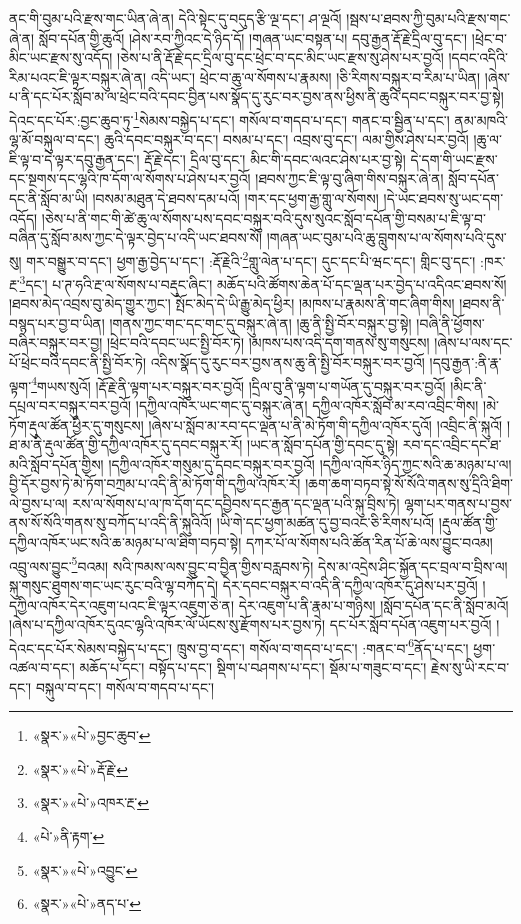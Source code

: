 ནང་གི་བུམ་པའི་རྫས་གང་ཡིན་ཞེ་ན། དེའི་སྟེང་དུ་བདུད་རྩི་ལྔ་དང་། ཤ་ལྔའོ། །སྦས་པ་ཐབས་ཀྱི་བུམ་པའི་རྫས་གང་ཞེ་ན། སློབ་དཔོན་གྱི་ཆུའོ། །ཤེས་རབ་ཀྱིའང་དེ་ཉིད་དོ། །གཞན་ཡང་བསྟན་པ། དབུ་རྒྱན་རྡོ་རྗེ་དྲིལ་བུ་དང་། །ཕྲེང་བ་མིང་ཡང་རྫས་སུ་འདོད། །ཅེས་པ་ནི་རྡོ་རྗེ་དང་དྲིལ་བུ་དང་ཕྲེང་བ་དང་མིང་ཡང་རྫས་སུ་ཤེས་པར་བྱའོ། །དབང་འདིའི་རིམ་པའང་ཇི་ལྟར་བསྐུར་ཞེ་ན། འདི་ཡང་། ཕྲེང་བ་ཆུ་ལ་སོགས་པ་རྣམས། །ཅི་རིགས་བསྐུར་བ་རིམ་པ་ཡིན། །ཞེས་པ་ནི་དང་པོར་སློབ་མ་ལ་ཕྲེང་བའི་དབང་བྱིན་པས་སྣོད་དུ་རུང་བར་བྱས་ནས་ཕྱིས་ནི་ཆུའི་དབང་བསྐུར་བར་བྱ་སྟེ། དེའང་དང་པོར་:བྱང་ཆུབ་ཏུ་\footnote{«སྣར་»«པེ་»བྱང་ཆུབ་}སེམས་བསྐྱེད་པ་དང་། གསོལ་བ་གདབ་པ་དང་། གནང་བ་སྦྱིན་པ་དང་། ནམ་མཁའི་ལྷ་མོ་བསྐུལ་བ་དང་། ཆུའི་དབང་བསྐུར་བ་དང་། བསམ་པ་དང་། འབྲས་བུ་དང་། ལམ་གྱིས་ཤེས་པར་བྱའོ། །ཆུ་ལ་ཇི་ལྟ་བ་དེ་ལྟར་དབུ་རྒྱན་དང་། རྡོ་རྗེ་དང་། དྲིལ་བུ་དང་། མིང་གི་དབང་ལའང་ཤེས་པར་བྱ་སྟེ། དེ་དག་གི་ཡང་རྫས་དང་སྔགས་དང་ལྷའི་ཁ་དོག་ལ་སོགས་པ་ཤེས་པར་བྱའོ། །ཐབས་ཀྱང་ཇི་ལྟ་བུ་ཞིག་གིས་བསྐུར་ཞེ་ན། སློབ་དཔོན་དང་ནི་སློབ་མ་ཡི། །བསམ་མཐུན་དེ་ཐབས་དམ་པའོ། །གར་དང་ཕྱག་རྒྱ་གླུ་ལ་སོགས། །དེ་ཡང་ཐབས་སུ་ཡང་དག་འདོད། །ཅེས་པ་ནི་གང་གི་ཚེ་ཆུ་ལ་སོགས་པས་དབང་བསྐུར་བའི་དུས་སུའང་སློབ་དཔོན་གྱི་བསམ་པ་ཇི་ལྟ་བ་བཞིན་དུ་སློབ་མས་ཀྱང་དེ་ལྟར་བྱེད་པ་འདི་ཡང་ཐབས་སོ། །གཞན་ཡང་བུམ་པའི་ཆུ་བླུགས་པ་ལ་སོགས་པའི་དུས་སུ། གར་བསྒྱུར་བ་དང་། ཕྱག་རྒྱ་བྱེད་པ་དང་། :རྡོ་རྗེའི་\footnote{«སྣར་»«པེ་»རྡོ་རྗེ་}གླུ་ལེན་པ་དང་། དུང་དང་པི་ཝང་དང་། གླིང་བུ་དང་། :ཁར་རྔ་\footnote{«སྣར་»«པེ་»འཁར་རྔ་}དང་། པ་ཊ་ཧའི་རྔ་ལ་སོགས་པ་བརྡུང་ཞིང་། མཆོད་པའི་ཚོགས་ཆེན་པོ་དང་ལྡན་པར་བྱེད་པ་འདིའང་ཐབས་སོ། །ཐབས་མེད་འབྲས་བུ་མེད་གྱུར་ཀྱང་། སྤོང་མེད་དེ་ཡི་རྒྱུ་མེད་ཕྱིར། །མཁས་པ་རྣམས་ནི་གང་ཞིག་གིས། །ཐབས་ནི་བསྙད་པར་བྱ་བ་ཡིན། །གནས་ཀྱང་གང་དང་གང་དུ་བསྐུར་ཞེ་ན། །ཆུ་ནི་སྤྱི་བོར་བསྐུར་བྱ་སྟེ། །བཞི་ནི་ཕྱོགས་བཞིར་བསྐུར་བར་བྱ། །ཕྲེང་བའི་དབང་ཡང་སྤྱི་བོར་ཏེ། །མཁས་པས་འདི་དག་གནས་སུ་གསུངས། །ཞེས་པ་ལས་དང་པོ་ཕྲེང་བའི་དབང་ནི་སྤྱི་བོར་ཏེ། འདིས་སྣོད་དུ་རུང་བར་བྱས་ནས་ཆུ་ནི་སྤྱི་བོར་བསྐུར་བར་བྱའོ། །དབུ་རྒྱན་:ནི་རྣ་ལྟག་\footnote{«པེ་»ནི་རྟག་}གཡས་སུའོ། །རྡོ་རྗེ་ནི་ལྟག་པར་བསྐུར་བར་བྱའོ། །དྲིལ་བུ་ནི་ལྟག་པ་གཡོན་དུ་བསྐུར་བར་བྱའོ། །མིང་ནི་དཔྲལ་བར་བསྐུར་བར་བྱའོ། །དཀྱིལ་འཁོར་ཡང་གང་དུ་བསྐུར་ཞེ་ན། དཀྱིལ་འཁོར་སློབ་མ་རབ་འབྲིང་གིས། །མེ་ཏོག་རྡུལ་ཚོན་ཕྱིར་དུ་གསུངས། །ཞེས་པ་སློབ་མ་རབ་དང་ལྡན་པ་ནི་མེ་ཏོག་གི་དཀྱིལ་འཁོར་དུའོ། །འབྲིང་ནི་སྐུའོ། །ཐ་མ་ནི་རྡུལ་ཚོན་གྱི་དཀྱིལ་འཁོར་དུ་དབང་བསྐུར་རོ། །ཡང་ན་སློབ་དཔོན་གྱི་དབང་དུ་སྟེ། རབ་དང་འབྲིང་དང་ཐ་མའི་སློབ་དཔོན་གྱིས། །དཀྱིལ་འཁོར་གསུམ་དུ་དབང་བསྐུར་བར་བྱའོ། །དཀྱིལ་འཁོར་ཉིད་ཀྱང་སའི་ཆ་མཉམ་པ་ལ། བྱི་དོར་བྱས་ཏེ་མེ་ཏོག་བཀྲམ་པ་འདི་ནི་མེ་ཏོག་གི་དཀྱིལ་འཁོར་རོ། །ཆག་ཆག་བཏབ་སྟེ་སོ་སོའི་གནས་སུ་དྲིའི་ཐིག་ལེ་བྱས་པ་ལ། རས་ལ་སོགས་པ་ལ་ཁ་དོག་དང་དབྱིབས་དང་རྒྱན་དང་ལྡན་པའི་སྐུ་བྲིས་ཏེ། ལྷག་པར་གནས་པ་བྱས་ནས་སོ་སོའི་གནས་སུ་བཀོད་པ་འདི་ནི་སྐུའིའོ། །ཡི་གེ་དང་ཕྱག་མཚན་དུ་བྱ་བའང་ཅི་རིགས་པའོ། །རྡུལ་ཚོན་གྱི་དཀྱིལ་འཁོར་ཡང་སའི་ཆ་མཉམ་པ་ལ་ཐིག་བཏབ་སྟེ། དཀར་པོ་ལ་སོགས་པའི་ཚོན་རིན་པོ་ཆེ་ལས་བྱུང་བའམ། འབྲུ་ལས་བྱུང་\footnote{«སྣར་»«པེ་»འབྱུང་}བའམ། སའི་ཁམས་ལས་བྱུང་བ་བྱིན་གྱིས་བརླབས་ཏེ། དེས་མ་འདྲེས་ཤིང་སྐྱོན་དང་བྲལ་བ་བྲིས་ལ། སྐུ་གསུང་ཐུགས་གང་ཡང་རུང་བའི་ལྷ་བཀོད་དེ། དེར་དབང་བསྐུར་བ་འདི་ནི་དཀྱིལ་འཁོར་དུ་ཤེས་པར་བྱའོ། །དཀྱིལ་འཁོར་དེར་འཇུག་པའང་ཇི་ལྟར་འཇུག་ཅེ་ན། དེར་འཇུག་པ་ནི་རྣམ་པ་གཉིས། །སློབ་དཔོན་དང་ནི་སློབ་མའོ། །ཞེས་པ་དཀྱིལ་འཁོར་དུའང་ལྷའི་འཁོར་ལོ་ཡོངས་སུ་རྫོགས་པར་བྱས་ཏེ། དང་པོར་སློབ་དཔོན་འཇུག་པར་བྱའོ། །དེའང་དང་པོར་སེམས་བསྐྱེད་པ་དང་། ཁྲུས་བྱ་བ་དང་། གསོལ་བ་གདབ་པ་དང་། :གནང་བ་\footnote{«སྣར་»«པེ་»ནད་པ་}ནོད་པ་དང་། ཕྱག་འཚལ་བ་དང་། མཆོད་པ་དང་། བསྟོད་པ་དང་། སྡིག་པ་བཤགས་པ་དང་། སྡོམ་པ་གཟུང་བ་དང་། རྗེས་སུ་ཡི་རང་བ་དང་། བསྐུལ་བ་དང་། གསོལ་བ་གདབ་པ་དང་། 